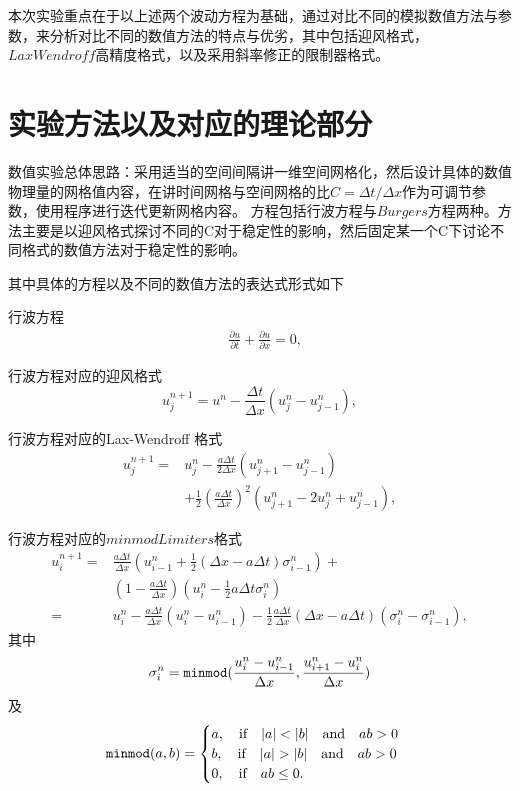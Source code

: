\documentclass[10.5pt
]{article}
\begin{document}
本次实验重点在于以上述两个波动方程为基础，通过对比不同的模拟数值方法与参数，来分析对比不同的数值方法的特点与优劣，其中包括迎风格式，$LaxWendroff$高精度格式，以及采用斜率修正的限制器格式。

\section{实验方法以及对应的理论部分}
数值实验总体思路：采用适当的空间间隔讲一维空间网格化，然后设计具体的数值物理量的网格值内容，在讲时间网格与空间网格的比$C = \Delta t / \Delta x$作为可调节参数，使用程序进行迭代更新网格内容。
方程包括行波方程与$Burgers$方程两种。方法主要是以迎风格式探讨不同的C对于稳定性的影响，然后固定某一个C下讨论不同格式的数值方法对于稳定性的影响。

其中具体的方程以及不同的数值方法的表达式形式如下

行波方程
\begin{align}
& \frac{\partial u}{\partial t} + \frac{\partial u}{\partial x} = 0,
\label{EqnCon}
\end{align}

行波方程对应的迎风格式
\begin{equation}
u_j^{n+1} = u^n - \frac{\Delta t}{\Delta x} (u_j^n - u_{j-1}^n), \label{EqnUpwind}
\end{equation}

行波方程对应的Lax-Wendroff 格式
\begin{align}
	u_j^{n+1} 
	=&
	u_j^{n} 
	-
	\frac{a \Delta t}{ 2 \Delta x } (  	u_{j+1}^{n} - u_{j-1}^{n} ) \\
	&+ \frac{1}{2} \left( \frac{a \Delta t}{ \Delta x } \right)^2 (  	u_{j+1}^{n}- 2 u_j^n + u_{j-1}^{n} ),
\end{align}

 
行波方程对应的$minmod Limiters$格式
\begin{equation}
\begin{aligned}
u_i^{n+1}= & \frac{a \Delta t}{\Delta x}\left(u_{i-1}^n+\frac{1}{2}(\Delta x-a \Delta t) \sigma_{i-1}^n\right)+ \\
& \left(1-\frac{a \Delta t}{\Delta x}\right)\left(u_i^n-\frac{1}{2} a \Delta t \sigma_i^n\right) \\
= & u_i^n-\frac{a \Delta t}{\Delta x}\left(u_i^n-u_{i-1}^n\right)-\frac{1}{2} \frac{a \Delta t}{\Delta x}(\Delta x-a \Delta t)\left(\sigma_i^n-\sigma_{i-1}^n\right),
\end{aligned}
\end{equation}
其中
\begin{equation}
	\sigma_i^n = \verb|minmod| ( \frac{u_i^n - u_{i-1}^{n}}{ \Delta x }, \frac{u_{i+1}^n - u_{i}^{n}}{ \Delta x } )
\end{equation}
及
\begin{equation}
	\verb|minmod|(a, b) = 
	\begin{cases}
		a, \qif |a| < |b| \qand ab > 0\\
		b, \qif |a| > |b| \qand ab > 0\\
		0, \qif ab \leq 0.
	\end{cases}
\end{equation}
\end{document}
